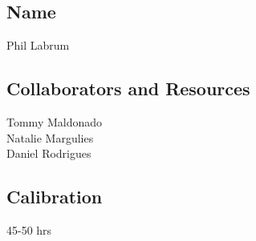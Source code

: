 \documentclass[submit]{harvardml}
\begin{document}
\newpage
\subsection*{Name}
Phil Labrum
\subsection*{Collaborators and Resources}
Tommy Maldonado\\
Natalie Margulies\\
Daniel Rodrigues\\

\subsection*{Calibration}
45-50 hrs
\end{document}
